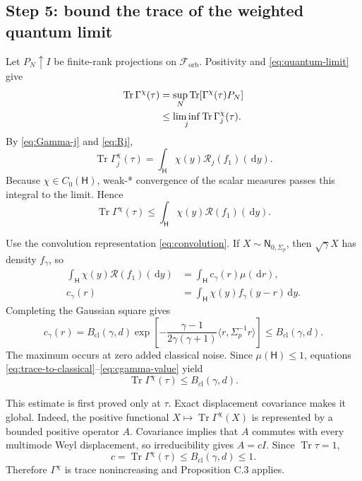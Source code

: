 \documentclass[11pt]{article}
\newcommand{\Hc}{\mathsf H}
\newcommand{\F}{\mathcal F_{\mathrm{orb}}}
\newcommand{\Tr}{\operatorname{Tr}}
\newcommand{\dd}{\,\mathrm d}
\newcommand{\Bcl}{B_{\mathrm{cl}}}
\begin{document}
\subsection*{Step 5: bound the trace of the weighted quantum limit}

Let $P_N\uparrow I$ be finite-rank projections on $\F$.  Positivity and
\eqref{eq:quantum-limit} give
\begin{align}
  \Tr\Gamma^\chi(\tau)
  &=\sup_N\Tr[\Gamma^\chi(\tau)P_N]\notag\\
  &\leq\liminf_j\Tr\Gamma_j^\chi(\tau).
  \label{eq:trace-liminf}
\end{align}
By \eqref{eq:Gamma-j} and \eqref{eq:Rj},
\[
  \Tr\Gamma_j^\chi(\tau)
  =\int_{\Hc}\chi(y)\mathcal R_j(f_1)(\dd y).
\]
Because $\chi\in C_0(\Hc)$, weak-* convergence of the scalar measures passes
this integral to the limit.  Hence
\begin{equation}\label{eq:trace-to-classical}
  \Tr\Gamma^\chi(\tau)
  \leq\int_{\Hc}\chi(y)\mathcal R(f_1)(\dd y).
\end{equation}

Use the convolution representation \eqref{eq:convolution}.  If
$X\sim\mathsf N_{0,\Sigma_p}$, then $\sqrt\gamma X$ has density $f_\gamma$,
so
\begin{align}
  \int_{\Hc}\chi(y)\mathcal R(f_1)(\dd y)
  &=\int_{\Hc}c_\gamma(r)\mu(\dd r),
  \label{eq:cgamma-average}\\
  c_\gamma(r)
  &=\int_{\Hc}\chi(y)f_\gamma(y-r)\dd y.
  \label{eq:cgamma}
\end{align}
Completing the Gaussian square gives
\begin{equation}\label{eq:cgamma-value}
  c_\gamma(r)
  =\Bcl(\gamma,d)
  \exp\!\left[-\frac{\gamma-1}{2\gamma(\gamma+1)}
    \langle r,\Sigma_p^{-1}r\rangle\right]
  \leq\Bcl(\gamma,d).
\end{equation}
The maximum occurs at zero added classical noise.  Since
$\mu(\Hc)\leq1$, equations
\eqref{eq:trace-to-classical}--\eqref{eq:cgamma-value} yield
\begin{equation}\label{eq:trace-bound}
  \Tr\Gamma^\chi(\tau)\leq\Bcl(\gamma,d).
\end{equation}

This estimate is first proved only at $\tau$.  Exact displacement covariance
makes it global.  Indeed, the positive functional
$X\mapsto\Tr\Gamma^\chi(X)$ is represented by a bounded positive operator
$A$.  Covariance implies that $A$ commutes with every multimode Weyl
displacement, so irreducibility gives $A=cI$.  Since $\Tr\tau=1$,
\[
  c=\Tr\Gamma^\chi(\tau)\leq\Bcl(\gamma,d)\leq1.
\]
Therefore $\Gamma^\chi$ is trace nonincreasing and Proposition C.3 applies.
\end{document}
